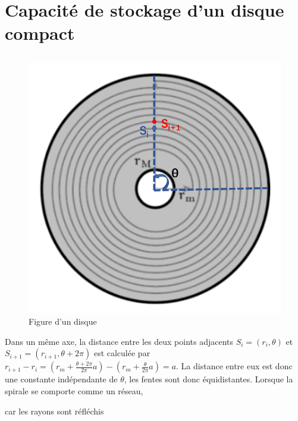 \documentclass[a4paper,12pt]{book}
\begin{document}
\renewcommand{\labelitemi}{$\blacktriangleright$}
\renewcommand{\labelitemii}{$\bullet$}


\section{Capacité de stockage d'un disque compact}
\subsection{}
\begin{figure}[h]
    \begin{center}
    \includegraphics[scale=0.5]{tr12.png}
    \end{center}
    \caption{Figure d'un disque}
\end{figure}
Dans un même axe, la distance entre les deux points adjacents $S_i=(r_i,\theta)$ 
et $S_{i+1}=(r_{i+1},\theta+2\pi)$ est calculée par $r_{i+1}-r_i=\left(r_m+\frac{\theta+2\pi}{2\pi}a\right)-\left(r_m+\frac{\theta}{2\pi}a\right)=a$. 
La distance entre eux est donc une constante indépendante de $\theta$, les fentes sont donc équidistantes. Lorsque la spirale se comporte comme un réseau, 

\hspace*{\fill} 

 car les rayons sont réfléchis
\end{document}
